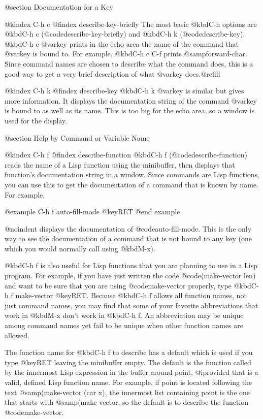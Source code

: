 {{{{{@section Documentation for a Key

@kindex C-h c
@findex describe-key-briefly
  The most basic @kbd{C-h} options are @kbd{C-h c}
(@code{describe-key-briefly}) and @kbd{C-h k} (@code{describe-key}).
@kbd{C-h c @var{key}} prints in the echo area the name of the command that
@var{key} is bound to.  For example, @kbd{C-h c C-f} prints
@samp{forward-char}.  Since command names are chosen to describe what the
command does, this is a good way to get a very brief description of what
@var{key} does.@refill

@kindex C-h k
@findex describe-key
  @kbd{C-h k @var{key}} is similar but gives more information.  It displays
the documentation string of the command @var{key} is bound to as well as
its name.  This is too big for the echo area, so a window is used for the
display.

@section Help by Command or Variable Name

@kindex C-h f
@findex describe-function
  @kbd{C-h f} (@code{describe-function}) reads the name of a Lisp function
using the minibuffer, then displays that function's documentation string
in a window.  Since commands are Lisp functions, you can use this to get
the documentation of a command that is known by name.  For example,

@example
C-h f auto-fill-mode @key{RET}
@end example

@noindent
displays the documentation of @code{auto-fill-mode}.  This is the only
way to see the documentation of a command that is not bound to any key
(one which you would normally call using @kbd{M-x}).

  @kbd{C-h f} is also useful for Lisp functions that you are planning to
use in a Lisp program.  For example, if you have just written the code
@code{(make-vector len)} and want to be sure that you are using
@code{make-vector} properly, type @kbd{C-h f make-vector @key{RET}}.  Because
@kbd{C-h f} allows all function names, not just command names, you may find
that some of your favorite abbreviations that work in @kbd{M-x} don't work
in @kbd{C-h f}.  An abbreviation may be unique among command names yet fail
to be unique when other function names are allowed.

  The function name for @kbd{C-h f} to describe has a default which is
used if you type @key{RET} leaving the minibuffer empty.  The default is
the function called by the innermost Lisp expression in the buffer around
point, @i{provided} that is a valid, defined Lisp function name.  For
example, if point is located following the text @samp{(make-vector (car
x)}, the innermost list containing point is the one that starts with
@samp{(make-vector}, so the default is to describe the function
@code{make-vector}.

}}}}}
